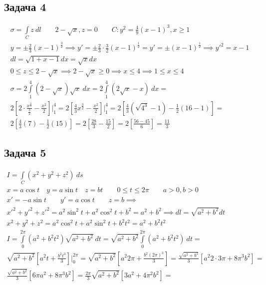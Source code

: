 \documentclass[a4paper,fleqn,12pt]{article}
\theoremstyle{definition}
\begin{document}
\subsection*{Задача 4}
\begin{gather*}
\sigma = \int\limits_C z \ dl \qquad 2-\sqrt{x}, z = 0 \qquad C: y^2 = \frac{4}{9} (x-1)^3, x \geq 1 \\
y = \pm \frac{2}{3} (x-1)^{\frac{3}{2}} \implies y' = \pm \frac{2}{3} \cdot \frac{3}{2} (x-1)^{\frac{1}{2}} =
y' = \pm (x-1)^{\frac{1}{2}} \implies y'^2 = x-1 \\
dl = \sqrt{1+x-1}dx = \sqrt{x} dx \\
0 \leq z \leq 2-\sqrt{x} \implies 2-\sqrt{x} \geq 0 \implies x \leq 4 \implies 1\leq x \leq 4\\
\sigma = 2\int\limits_1 ^4 (2-\sqrt{x})\sqrt{x} \ dx = 
2\int\limits_1 ^4 (2\sqrt{x} - x) \ dx = \\
2\left[2 \cdot \frac{x^{\frac{3}{2}}}{\frac{3}{2}} - \frac{x^2}{2} \right] \Big|_1 ^4 = 
2\left[\frac{4}{3} x^{\frac{3}{2}} - \frac{x^2}{2} \right] \Big|_1 ^4 = 
2\left[\frac{4}{3} \left( \sqrt{4^3} - 1 \right)-  \frac{1}{2} \left(16-1 \right) \right] = \\
2\left[\frac{4}{3} \left( 7 \right)- \frac{1}{2} \left( 15 \right) \right] = 
2\left[\frac{28}{3} - \frac{15}{2} \right] = 
2\left[\frac{56-45}{6} \right] = \frac{11}{3}
\end{gather*}

\subsection*{Задача 5}
\begin{gather*}
I = \int\limits_{C}(x^2 + y^2 + z^2) \ ds \\
x = a\cos t \quad y = a\sin t \quad z = bt \qquad 0 \leq t \leq 2\pi \qquad a>0,b>0 \\
x' = -a\sin t \qquad y' = a\cos t \qquad z = b \implies \\
x'^2 + y'^2 + z'^2 = a^2 \sin^2 t + a^2 \cos^2 t + b^2 = a^2+b^2 \implies dl = \sqrt{a^2+b^2}dt \\
x^2 + y^2 + z^2 = a^2 \cos^2 t + a^2 \sin^2 t + b^2 t^2 = a^2 + b^2t^2 \\
I = \int\limits_0 ^{2\pi} (a^2 + b^2t^2)\sqrt{a^2+b^2} \ dt = 
\sqrt{a^2+b^2} \int\limits_0 ^{2\pi} (a^2 + b^2t^2) \ dt = \\
\sqrt{a^2+b^2} \left[ a^2t + \frac{b^2t^3}{3}\right] \Big|_0 ^{2\pi} = 
\sqrt{a^2+b^2} \left[ a^2 2\pi + \frac{b^2(2\pi)^3}{3} \right] = 
\frac{\sqrt{a^2+b^2}}{3} [a^2 2 \cdot3 \pi + 8\pi^3b^2] = \\
\frac{\sqrt{a^2+b^2}}{3} [6\pi a^2 + 8\pi^3 b^2] = 
\frac{2\pi}{3}\sqrt{a^2+b^2} [3a^2 + 4\pi^2 b^2] = 
\end{gather*}
\end{document}
